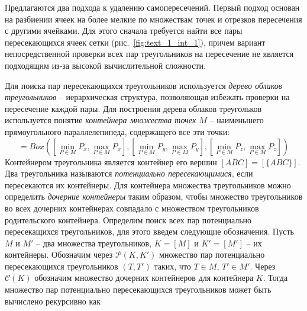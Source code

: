 \documentclass[a4paper,14pt]{extarticle}                     %
\theoremstyle{plain}                                         %
\begin{document}
Предлагаются два подхода к удалению самопересечений.
Первый подход основан на разбиении ячеек на более мелкие по множествам точек и отрезков пересечения с другими ячейками.
Для этого сначала требуется найти все пары пересекающихся ячеек сетки (рис.~\ref{fig:text_1_int_1}), причем вариант непосредственной проверки всех пар треугольников на пересечение не является подходящим из-за высокой вычислительной сложности.

Для поиска пар пересекающихся треугольников используется \textit{дерево облаков треугольников} -- иерархическая структура, позволяющая избежать проверки на пересечение каждой пары.
Для построения дерева облаков треугольков используется понятие \textit{контейнера множества точек} $M$ -- наименьшего прямоугольного параллелепипеда, содержащего все эти точки:
\begin{equation*}
[M] = Box \left( \left[\min_{P \in M}{P_x}, \max_{P \in M}{P_x}\right],
                 \left[\min_{P \in M}{P_y}, \max_{P \in M}{P_y}\right],
                 \left[\min_{P \in M}{P_z}, \max_{P \in M}{P_z}\right] \right)
\end{equation*}
Контейнером треугольника является контейнер его вершин $[ABC] = [\{ABC\}]$.
Два треугольника называются \textit{потенциально пересекающимися}, если пересекаются их контейнеры.
Для контейнера множества треугольников можно определить \textit{дочерние контейнеры} таким образом, чтобы множество треугольников во всех дочерних контейнерах совпадало с множеством треугольников родительского контейнера.
Определим поиск всех пар потенциально пересекащихся треугольников, для этого введем следующие обозначения.
Пусть $M$ и $M'$ -- два множества треугольников, $K = [M]$ и $K' = [M']$ -- их контейнеры.
Обозначим через $\mathscr{P}(K, K')$ множество пар потенциально пересекающихся треугольников $(T, T')$ таких, что $T \in M$, $T' \in M'$.
Через $\mathscr{C}(K)$ обозначим множество дочерних контейнеров для контейнера $K$.
Тогда множество пар потенциально пересекающихся треугольников может быть вычислено рекурсивно как
\end{document}
